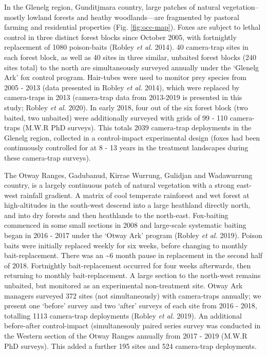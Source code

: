 \documentclass[11pt,a4paper,titlepage,twoside,openright]{style/unimelbthesis}
\begin{document}
\begin{mainmatter}
In the Glenelg region, Gunditjmara country, large patches of natural vegetation--mostly lowland forests and heathy woodlands---are fragmented by pastoral farming and residential properties (Fig. \ref{fig:occ-map}). Foxes are subject to lethal control in three distinct forest blocks since October 2005, with fortnightly replacement of 1080 poison-baits (Robley \emph{et al.} 2014). 40 camera-trap sites in each forest block, as well as 40 sites in three similar, unbaited forest blocks (240 sites total) to the north are simultaneously surveyed annually under the `Glenelg Ark' fox control program. Hair-tubes were used to monitor prey species from 2005 - 2013 (data presented in Robley \emph{et al.} 2014), which were replaced by camera-traps in 2013 (camera-trap data from 2013-2019 is presented in this study; Robley \emph{et al.} 2020). In early 2018, four out of the six forest block (two baited, two unbaited) were additionally surveyed with grids of 99 - 110 camera-traps (M.W.R PhD surveys). This totals 2039 camera-trap deployments in the Glenelg region, collected in a control-impact experimental design (foxes had been continuously controlled for at 8 - 13 years in the treatment landscapes during these camera-trap surveys).

The Otway Ranges, Gadubanud, Kirrae Wurrung, Gulidjan and Wadawurrung country, is a largely continuous patch of natural vegetation with a strong east-west rainfall gradient. A matrix of cool temperate rainforest and wet forest at high-altitudes in the south-west descend into a large heathland directly north, and into dry forests and then heathlands to the north-east. Fox-baiting commenced in some small sections in 2008 and large-scale systematic baiting began in 2016 - 2017 under the `Otway Ark' program (Robley \emph{et al.} 2019). Poison baits were initially replaced weekly for six weeks, before changing to monthly bait-replacement. There was an \textasciitilde6 month pause in replacement in the second half of 2018. Fortnightly bait-replacement occurred for four weeks afterwards, then returning to monthly bait-replacement. A large section to the north-west remains unbaited, but monitored as an experimental non-treatment site. Otway Ark managers surveyed 372 sites (not simultaneously) with camera-traps annually; we present one `before' survey and two `after' surveys of each site from 2016 - 2018, totalling 1113 camera-trap deployments (Robley \emph{et al.} 2019). An additional before-after control-impact (simultanesouly paired series survey was conducted in the Western section of the Otway Ranges annually from 2017 - 2019 (M.W.R PhD surveys). This added a further 195 sites and 524 camera-trap deployments.


\end{mainmatter}
\end{document}
